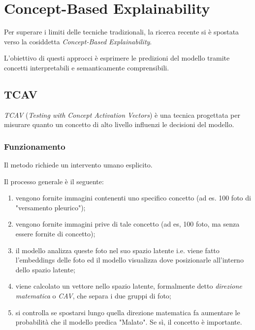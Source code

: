 \section{Concept-Based Explainability}

Per superare i limiti delle tecniche tradizionali, la ricerca recente si è spostata verso la cosiddetta \textit{Concept-Based Explainability}.

L'obiettivo di questi approcci è esprimere le predizioni del modello tramite concetti interpretabili e semanticamente comprensibili.

\subsection{TCAV}

\textit{TCAV} (\textit{Testing with Concept Activation Vectors}) è una tecnica progettata per misurare quanto un concetto di alto livello influenzi le decisioni del modello.

\subsubsection{Funzionamento}

Il metodo richiede un intervento umano esplicito.

Il processo generale è il seguente:

\begin{enumerate}
    \item vengono fornite immagini contenenti uno specifico concetto (ad es. 100 foto di "versamento pleurico");
    
    \item vengono fornite immagini prive di tale concetto (ad es, 100 foto, ma senza essere fornite di concetto);
    
    \item il modello analizza queste foto nel suo spazio latente i.e. viene fatto l'embeddings delle foto ed il modello visualizza dove posizionarle all'interno dello spazio latente;
    
    \item viene calcolato un vettore nello spazio latente, formalmente detto \textit{direzione matematica} o \textit{CAV}, che separa i due gruppi di foto;
    
    \item si controlla se spostarsi lungo quella direzione matematica fa aumentare le probabilità che il modello predica "Malato". Se sì, il concetto è importante.
\end{enumerate}

